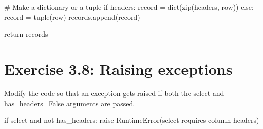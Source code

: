 \documentclass[
  letterpaper,
  DIV=11,
  numbers=noendperiod]{scrreprt}
\newenvironment{Shaded}{\begin{snugshade}}{\end{snugshade}}
\newcommand{\BuiltInTok}[1]{\textcolor[rgb]{0.00,0.46,0.62}{#1}}
\newcommand{\CommentTok}[1]{\textcolor[rgb]{0.37,0.37,0.37}{#1}}
\newcommand{\ControlFlowTok}[1]{\textcolor[rgb]{0.00,0.46,0.62}{#1}}
\newcommand{\KeywordTok}[1]{\textcolor[rgb]{0.00,0.46,0.62}{#1}}
\newcommand{\NormalTok}[1]{\textcolor[rgb]{0.00,0.46,0.62}{#1}}
\newcommand{\OperatorTok}[1]{\textcolor[rgb]{0.37,0.37,0.37}{#1}}
\newcommand{\PreprocessorTok}[1]{\textcolor[rgb]{0.68,0.00,0.00}{#1}}
\newcommand{\StringTok}[1]{\textcolor[rgb]{0.13,0.47,0.30}{#1}}
\begin{document}
\begin{Shaded}
\begin{Highlighting}[]
            \CommentTok{\# Make a dictionary or a tuple}
            \ControlFlowTok{if}\NormalTok{ headers:}
\NormalTok{                record }\OperatorTok{=} \BuiltInTok{dict}\NormalTok{(}\BuiltInTok{zip}\NormalTok{(headers, row))}
            \ControlFlowTok{else}\NormalTok{:}
\NormalTok{                record }\OperatorTok{=} \BuiltInTok{tuple}\NormalTok{(row)}
\NormalTok{            records.append(record)}

        \ControlFlowTok{return}\NormalTok{ records}
\end{Highlighting}
\end{Shaded}

\hypertarget{exercise-3.8-raising-exceptions}{%
\section{Exercise 3.8: Raising
exceptions}\label{exercise-3.8-raising-exceptions}}

Modify the code so that an exception gets raised if both the select and
has\_headers=False arguments are passed.

\begin{Shaded}
\begin{Highlighting}[]
    \ControlFlowTok{if}\NormalTok{ select }\KeywordTok{and} \KeywordTok{not}\NormalTok{ has\_headers:}
        \ControlFlowTok{raise} \PreprocessorTok{RuntimeError}\NormalTok{(}\StringTok{\textquotesingle{}select requires column headers\textquotesingle{}}\NormalTok{)}
\end{Highlighting}
\end{Shaded}
\end{document}
